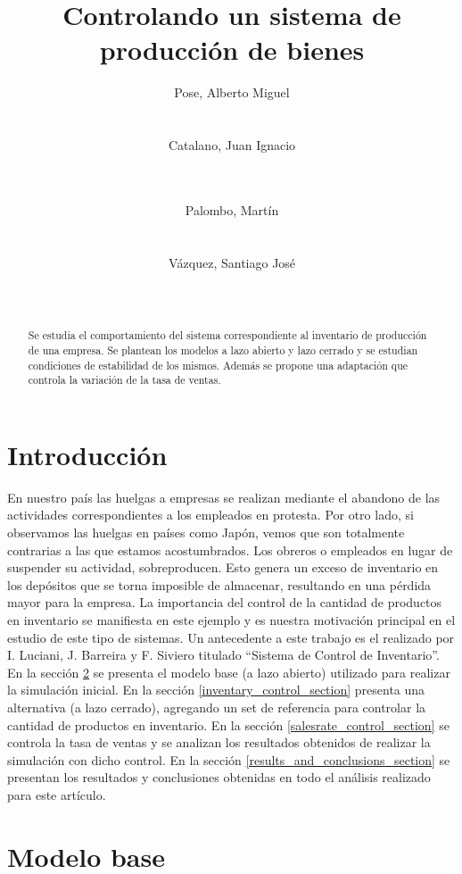 \documentclass{sig-alternate}
\title{Controlando un sistema de producción de bienes}
\author{
\alignauthor
Pose, Alberto Miguel\\
       \affaddr{Instituto Tecnológico de Buenos Aires}\\
       \affaddr{Buenos Aires, Argentina}\\
       \email{apose@alu.itba.edu.ar}
\alignauthor
Catalano, Juan Ignacio\\
       \affaddr{Instituto Tecnológico de Buenos Aires}\\
       \affaddr{Buenos Aires, Argentina}\\
       \email{jcatalan@alu.itba.edu.ar}
\and
\alignauthor 
Palombo, Martín\\
       \affaddr{Instituto Tecnológico de Buenos Aires}\\
       \affaddr{Buenos Aires, Argentina}\\
       \email{mpalombo@alu.itba.edu.ar}
\alignauthor 
Vázquez, Santiago José\\
       \affaddr{Instituto Tecnológico de Buenos Aires}\\
       \affaddr{Buenos Aires, Argentina}\\
       \email{savazque@alu.itba.edu.ar}
}
\date{}
\begin{document}
\maketitle

\begin{abstract}
Se estudia el comportamiento del sistema correspondiente al inventario de producción de una empresa. Se plantean los modelos a lazo abierto y
lazo cerrado y se estudian condiciones de estabilidad de los mismos. Además se propone una adaptación que controla la variación de la tasa
de ventas.
\end{abstract}

\section{Introducción}
\label{intro_section}
En nuestro país las huelgas a empresas se realizan median\-te el abandono de las actividades correspondientes a los empleados en protesta. Por otro
lado, si observamos las huelgas en países como Japón, vemos que son totalmente contrarias a las que estamos acostumbrados. Los obreros o empleados
en lugar de suspender su actividad, sobreproducen. Esto genera un exceso de inventario en los depósitos que se torna imposible de almacenar,
resultando en una pérdida mayor para la empresa. La importancia del control de la cantidad de productos en inventario se manifiesta en este
ejemplo y es nuestra motivación principal en el estudio de este tipo de sistemas. Un antecedente a este trabajo es el realizado por I. Luciani, J. Barreira y
F. Siviero titulado ``Sistema de Control de Inventario''\cite{iluciani}.\\ 
En la sección \ref{model_section} se presenta el modelo base (a lazo abierto) utilizado para realizar la simulación inicial. En la sección \ref{inventary_control_section} 
presenta una alternativa (a lazo cerrado), agregando un set de referencia para controlar la cantidad de productos en inventario. En la sección 
\ref{salesrate_control_section} se controla la tasa de ventas y se analizan los resultados obtenidos de realizar la simulación con dicho 
control. En la sección \ref{results_and_conclusions_section} se presentan los resultados y conclusiones obtenidas en todo el análisis 
realizado para este artículo.

\section{Modelo base}
\label{model_section}
\end{document}
